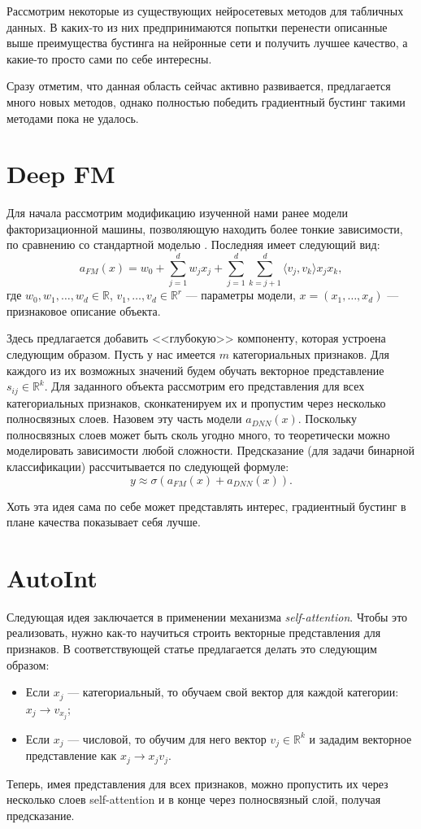 \documentclass[12pt,fleqn]{article}
\begin{document}
Рассмотрим некоторые из существующих нейросетевых методов для табличных данных. В каких-то из них предпринимаются попытки перенести описанные выше преимущества бустинга на нейронные сети и получить лучшее качество, а какие-то просто сами по себе интересны.

Сразу отметим, что данная область сейчас активно развивается, предлагается много новых методов, однако полностью победить градиентный бустинг такими методами пока не удалось.

\section{Deep FM}
Для начала рассмотрим модификацию изученной нами ранее модели факторизационной машины, позволяющую находить более тонкие зависимости, по сравнению со стандартной моделью \cite{deepfm}. Последняя имеет следующий вид:
\[
	a_{FM}(x) = w_0 + \sum_{j = 1}^d w_j x_j + \sum_{j = 1}^d \sum_{k = j + 1}^d \langle v_j, v_k \rangle x_j x_k,
\]
где $ w_0, w_1, \dots, w_d \in \mathbb{R} $, $ v_1, \dots, v_d \in \mathbb{R}^r $ --- параметры модели, $ x = \left(x_1, \dots, x_d \right) $ --- признаковое описание объекта.

Здесь предлагается добавить <<глубокую>> компоненту, которая устроена следующим образом. Пусть у нас имеется $ m $ категориальных признаков. Для каждого из их возможных значений будем обучать векторное представление $ s_{ij} \in \mathbb{R}^k $. Для заданного объекта рассмотрим его представления для всех категориальных признаков, сконкатенируем их и пропустим через несколько полносвязных слоев. Назовем эту часть модели $ a_{DNN}(x) $. Поскольку полносвязных слоев может быть сколь угодно много, то теоретически можно моделировать зависимости любой сложности. Предсказание (для задачи бинарной классификации) рассчитывается по следующей формуле:
\[
	y \approx \sigma(a_{FM}(x) + a_{DNN}(x)).	
\]

Хоть эта идея сама по себе может представлять интерес, градиентный бустинг в плане качества показывает себя лучше.

\section{AutoInt}
Следующая идея заключается в применении механизма \textit{self-attention}. Чтобы это реализовать, нужно как-то научиться строить векторные представления для признаков. В соответствующей статье \cite{autoint} предлагается делать это следующим образом:
\begin{itemize}
	\item Если $ x_j $ --- категориальный, то обучаем свой вектор для каждой категории: $ x_j \to v_{x_j} $;
	\item Если $ x_j $ --- числовой, то обучим для него вектор $ v_j \in \mathbb{R}^k $ и зададим векторное представление как $ x_j \to x_j v_j $.
\end{itemize}
Теперь, имея представления для всех признаков, можно пропустить их через несколько слоев self-attention и в конце через полносвязный слой, получая предсказание.
\end{document}

